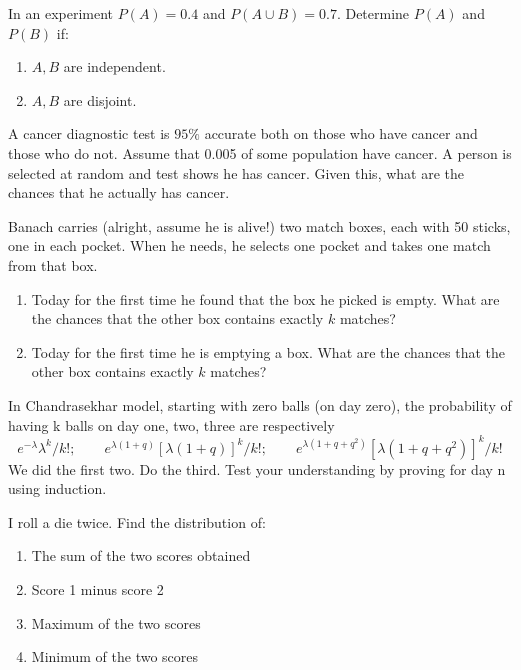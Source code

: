 \documentclass[12pt]{article}
\newenvironment{question}[2][Question]{\begin{trivlist}
\item[\hskip \labelsep {\bfseries #1}\hskip \labelsep {\bfseries #2.}]}{\end{trivlist}}
\begin{document}
\begin{question}{16}
In an experiment $P(A) = 0.4$ and $P(A \cup B) = 0.7$. Determine $P(A)$ and $P(B)$ if:
\begin{enumerate}
\item $A, B$ are independent.
\item $A, B$ are disjoint.
\end{enumerate}
\end{question}

\begin{question}{17}
A cancer diagnostic test is $95\%$ accurate both on those who have cancer and those who do not. Assume that 0.005 of some population have cancer. A person is selected at random and test shows he has cancer. Given this, what are the chances that he actually has cancer.
\end{question}

\begin{question}{18}
Banach carries (alright, assume he is alive!) two match boxes, each with 50 sticks, one in each pocket. When he needs, he selects one pocket and takes one match from that box. 
\begin{enumerate}
\item Today for the first time he found that the box he picked is empty. What are the chances that the other box contains exactly $k$ matches? 
\item Today for the first time he is emptying a box. What are the chances that the other box contains exactly $k$ matches?
\end{enumerate}
\end{question}

\begin{question}{19}
In Chandrasekhar model, starting with zero balls (on day zero), the probability of having k balls on day one, two, three are respectively
\[ 
e^{-\lambda}\lambda^{k}/k!;\qquad e^{\lambda(1+q)}[\lambda(1+q)]^{k}/k!;\qquad e^{\lambda(1+q+q^2)}[\lambda(1+q+q^2)]^{k}/k! 
\]
We did the first two. Do the third. Test your understanding by proving for day n using induction.
\end{question}

\begin{question}{20}
I roll a die twice. Find the distribution of:
\begin{enumerate}
\item The sum of the two scores obtained
\item Score 1 minus score 2
\item Maximum of the two scores
\item Minimum of the two scores
\end{enumerate}
\end{question}
\end{document}
